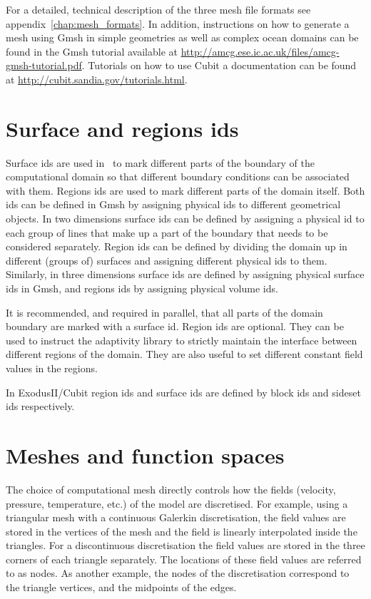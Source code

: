 For a detailed, technical description of the three mesh file formats see 
appendix~\ref{chap:mesh_formats}. In addition, instructions on how
to generate a mesh using Gmsh in simple geometries as well as complex
ocean domains can be found in the Gmsh tutorial available at
\url{http://amcg.ese.ic.ac.uk/files/amcg-gmsh-tutorial.pdf}. Tutorials 
on how to use Cubit a documentation can be found at 
\url{http://cubit.sandia.gov/tutorials.html}.

\section{Surface and regions ids}
\label{sec:surface_and_region_ids}
Surface ids are used in \fluidity\ to mark different parts of the boundary of the
computational domain so that different boundary conditions can be associated
with them. Regions ids are used to mark different parts of the domain itself.
Both ids can be defined in Gmsh by assigning physical ids to different
geometrical objects. In two dimensions surface ids can be defined by assigning a
physical id to each group of lines that make up a part of the boundary that
needs to be considered separately. Region ids can be defined by dividing the
domain up in different (groups of) surfaces and assigning different 
physical ids to them. Similarly, in three dimensions surface ids are defined by
assigning physical surface ids in Gmsh, and regions ids by assigning physical
volume ids.

It is recommended, and required in parallel, that all parts of the domain
boundary are marked with a surface id. Region ids are optional. They can be used
to instruct the adaptivity library to strictly maintain the interface between 
different regions of the domain. They are also useful to set different constant 
field values in the regions.

In ExodusII/Cubit region ids and surface ids are defined by block ids and 
sideset ids respectively. 

\section{Meshes and function spaces}
\label{sec:meshes_and_function_spaces}
The choice of computational mesh directly controls how the fields (velocity,
pressure, temperature, etc.) of the model are discretised. For example, using a
triangular mesh with a \Pone continuous Galerkin discretisation, the field
values are stored in the vertices of the mesh and the field is linearly
interpolated inside the triangles. For a discontinuous \PoDG discretisation the
field values are stored in the three corners of each triangle separately. The
locations of these field values are referred to as nodes. As another example, the
nodes of the \Ptwo discretisation correspond to the triangle vertices, and the
midpoints of the edges.


